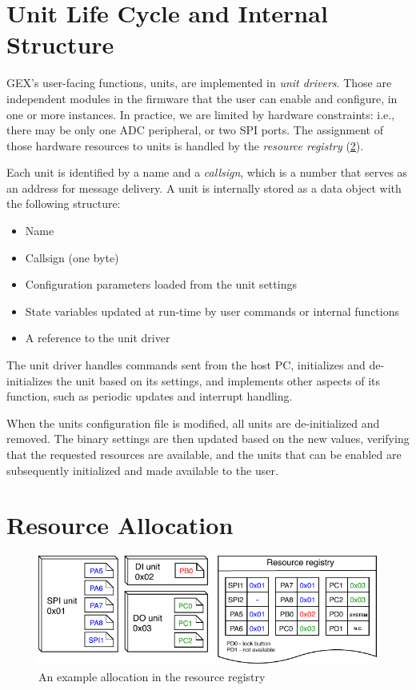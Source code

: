 \section{Unit Life Cycle and Internal Structure} \label{sec:units-function}

GEX's user-facing functions, units, are implemented in \textit{unit drivers}. Those are independent modules in the firmware that the user can enable and configure, in one or more instances. In practice, we are limited by hardware constraints: i.e., there may be only one \gls{ADC} peripheral, or two \gls{SPI} ports. The assignment of those hardware resources to units is handled by the \textit{resource registry} (\cref{sec:res-allocation}).



Each unit is identified by a name and a \textit{callsign}, which is a number that serves as an address for message delivery. A unit is internally stored as a data object with the following structure:

\begin{itemize}[itemsep=0pt]
	\item Name
	\item Callsign (one byte)
	\item Configuration parameters loaded from the unit settings
	\item State variables updated at run-time by user commands or internal functions
	\item A reference to the unit driver
\end{itemize}

The unit driver handles commands sent from the host \gls{PC}, initializes and de-initializes the unit based on its settings, and implements other aspects of its function, such as periodic updates and interrupt handling. 

When the units configuration file is modified, all units are de-initialized and removed. The binary settings are then updated based on the new values, verifying that the requested resources are available, and the units that can be enabled are subsequently initialized and made available to the user.

\section{Resource Allocation} \label{sec:res-allocation}

\begin{figure}[h]
	\centering
	\includegraphics[scale=1] {img/resource-repository.pdf}
	\caption{\label{fig:resource-repository}An example allocation in the resource registry}
\end{figure}

